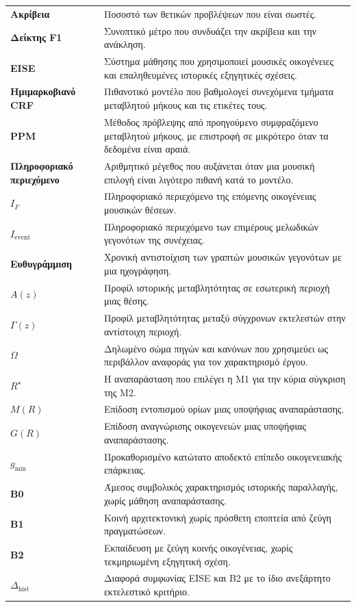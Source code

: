 \documentclass[11pt,a4paper]{extarticle}
\begin{document}
\begin{longtable}{>{\bfseries}p{4.0cm}p{10.7cm}}
Ακρίβεια & Ποσοστό των θετικών προβλέψεων που είναι σωστές. \\
Δείκτης F1 & Συνοπτικό μέτρο που συνδυάζει την ακρίβεια και την ανάκληση. \\
EISE & Σύστημα μάθησης που χρησιμοποιεί μουσικές οικογένειες και επαληθευμένες ιστορικές εξηγητικές σχέσεις. \\
Ημιμαρκοβιανό CRF & Πιθανοτικό μοντέλο που βαθμολογεί συνεχόμενα τμήματα μεταβλητού μήκους και τις ετικέτες τους. \\
PPM & Μέθοδος πρόβλεψης από προηγούμενο συμφραζόμενο μεταβλητού μήκους, με επιστροφή σε μικρότερο όταν τα δεδομένα είναι αραιά. \\
Πληροφοριακό περιεχόμενο & Αριθμητικό μέγεθος που αυξάνεται όταν μια μουσική επιλογή είναι λιγότερο πιθανή κατά το μοντέλο. \\
\(I_F\) & Πληροφοριακό περιεχόμενο της επόμενης οικογένειας μουσικών θέσεων. \\
\(I_{\mathrm{event}}\) & Πληροφοριακό περιεχόμενο των επιμέρους μελωδικών γεγονότων της συνέχειας. \\
Ευθυγράμμιση & Χρονική αντιστοίχιση των γραπτών μουσικών γεγονότων με μια ηχογράφηση. \\
\(A(z)\) & Προφίλ ιστορικής μεταβλητότητας σε εσωτερική περιοχή μιας θέσης. \\
\(\Gamma(z)\) & Προφίλ μεταβλητότητας μεταξύ σύγχρονων εκτελεστών στην αντίστοιχη περιοχή. \\
\(\Omega\) & Δηλωμένο σώμα πηγών και κανόνων που χρησιμεύει ως περιβάλλον αναφοράς για τον χαρακτηρισμό έργου. \\
\(R^\star\) & Η αναπαράσταση που επιλέγει η M1 για την κύρια σύγκριση της M2. \\
\(M(R)\) & Επίδοση εντοπισμού ορίων μιας υποψήφιας αναπαράστασης. \\
\(G(R)\) & Επίδοση αναγνώρισης οικογενειών μιας υποψήφιας αναπαράστασης. \\
\(g_{\min}\) & Προκαθορισμένο κατώτατο αποδεκτό επίπεδο οικογενειακής επάρκειας. \\
B0 & Άμεσος συμβολικός χαρακτηρισμός ιστορικής παραλλαγής, χωρίς μάθηση αναπαράστασης. \\
B1 & Κοινή αρχιτεκτονική χωρίς πρόσθετη εποπτεία από ζεύγη πραγματώσεων. \\
B2 & Εκπαίδευση με ζεύγη κοινής οικογένειας, χωρίς τεκμηριωμένη εξηγητική σχέση. \\
\(\Delta_{\mathrm{hist}}\) & Διαφορά συμφωνίας EISE και B2 με το ίδιο ανεξάρτητο εκτελεστικό κριτήριο. \\

\end{longtable}
\end{document}
